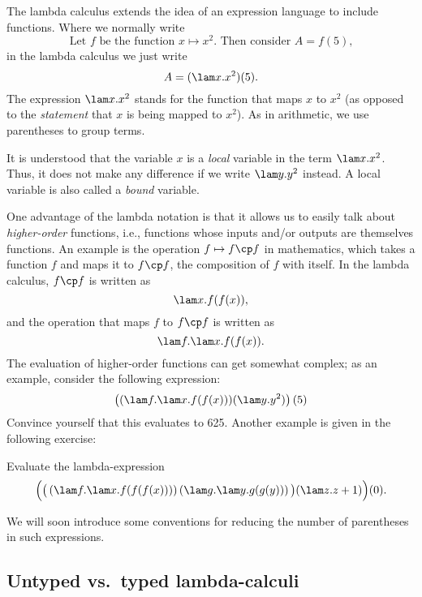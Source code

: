 \documentclass[12pt]{article}
\begin{document}
The lambda calculus extends the idea of an expression language to
include functions. Where we normally write
\[   \mbox{Let $f$ be the function $x\mapsto x^2$. Then consider $A=f(5)$,}
\]
in the lambda calculus we just write
\[   A = (\lam x.x^2)(5)  .
\]
The expression $\lam x.x^2$ stands for the function that maps $x$ to
$x^2$ (as opposed to the {\em statement} that $x$ is being mapped to
$x^2$). As in arithmetic, we use parentheses to group terms.

It is understood that the variable $x$ is a {\em local} variable in
the term $\lam x.x^2$. Thus, it does not make any difference if we
write $\lam y.y^2$ instead. A local variable is also called a {\em
  bound} variable.

One advantage of the lambda notation is that it allows us to easily
talk about {\em higher-order} functions, i.e., functions whose inputs
and/or outputs are themselves functions. An example is the operation
$f\mapsto f\cp f$ in mathematics, which takes a function $f$ and
maps it to $f\cp f$, the composition of $f$ with itself. In the lambda
calculus, $f\cp f$ is written as
\[         \lam x.f(f(x)),   
\]
and the operation that maps $f$ to $f\cp f$ is written as
\[         \lam f.\lam x.f(f(x)).
\]
The evaluation of higher-order functions can get somewhat complex; as
an example, consider the following expression:
\[         \left((\lam f.\lam x.f(f(x)))(\lam y.y^2)\right)(5)
\]
Convince yourself that this evaluates to 625. Another example is given
in the following exercise:

\begin{exercise}
Evaluate the lambda-expression
\[        \Big(
          \big(\left(\lam f.\lam x.f(f(f(x)))\right)
          \left(\lam g.\lam y.g(g(y))\right)\big)
          (\lam z.z+1)\Big)(0).
\]
\end{exercise}

We will soon introduce some conventions for reducing the number of
parentheses in such expressions.

\subsection{Untyped vs.\ typed lambda-calculi}
\end{document}
